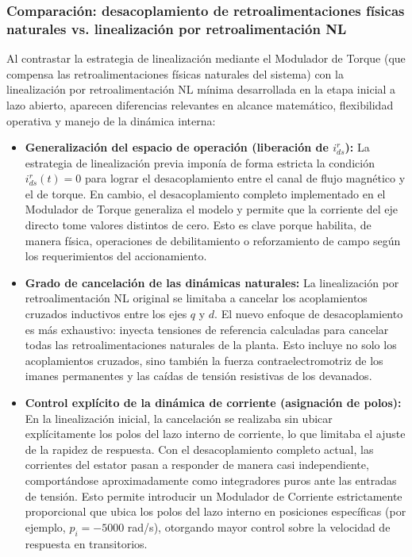 \documentclass[12pt, a4paper,journal, onecolumn, compsoc]{IEEEtran}
\begin{document}
\subsubsection{Comparación: desacoplamiento de retroalimentaciones físicas naturales vs. linealización por retroalimentación NL}

Al contrastar la estrategia de linealización mediante el Modulador de Torque (que compensa las retroalimentaciones físicas naturales del sistema) con la linealización por retroalimentación NL mínima desarrollada en la etapa inicial a lazo abierto, aparecen diferencias relevantes en alcance matemático, flexibilidad operativa y manejo de la dinámica interna:

\begin{itemize}
    \item \textbf{Generalización del espacio de operación (liberación de $i_{ds}^r$):} 
    La estrategia de linealización previa imponía de forma estricta la condición $i_{ds}^r(t)=0$ para lograr el desacoplamiento entre el canal de flujo magnético y el de torque. En cambio, el desacoplamiento completo implementado en el Modulador de Torque generaliza el modelo y permite que la corriente del eje directo tome valores distintos de cero. Esto es clave porque habilita, de manera física, operaciones de debilitamiento o reforzamiento de campo según los requerimientos del accionamiento.
    
    \item \textbf{Grado de cancelación de las dinámicas naturales:} 
    La linealización por retroalimentación NL original se limitaba a cancelar los acoplamientos cruzados inductivos entre los ejes $q$ y $d$. El nuevo enfoque de desacoplamiento es más exhaustivo: inyecta tensiones de referencia calculadas para cancelar todas las retroalimentaciones naturales de la planta. Esto incluye no solo los acoplamientos cruzados, sino también la fuerza contraelectromotriz de los imanes permanentes y las caídas de tensión resistivas de los devanados.
    
    \item \textbf{Control explícito de la dinámica de corriente (asignación de polos):} 
    En la linealización inicial, la cancelación se realizaba sin ubicar explícitamente los polos del lazo interno de corriente, lo que limitaba el ajuste de la rapidez de respuesta. Con el desacoplamiento completo actual, las corrientes del estator pasan a responder de manera casi independiente, comportándose aproximadamente como integradores puros ante las entradas de tensión. Esto permite introducir un Modulador de Corriente estrictamente proporcional que ubica los polos del lazo interno en posiciones específicas (por ejemplo, $p_i=-5000$ rad/s), otorgando mayor control sobre la velocidad de respuesta en transitorios.
\end{itemize}
\end{document}

